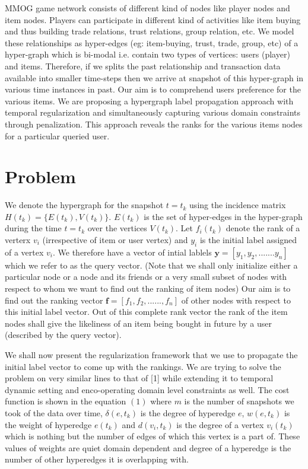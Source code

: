 \documentclass[conference]{IEEEtran}
\begin{document}
MMOG game network consists of different kind of nodes like player nodes and item nodes. Players can participate in different kind of activities like item buying and thus building trade relations, trust relations, group relation, etc. We model these relationships as hyper-edges (eg: item-buying, trust, trade, group, etc) of a hyper-graph which is bi-modal i.e. contain two types of vertices: users (player) and items. Therefore, if we splits the past relationship and transaction data available into smaller time-steps then we arrive at snapshot of this hyper-graph in various time instances in past. Our aim is to comprehend users preference for the various items. We are proposing a hypergraph label propagation approach with temporal regularization and simultaneously capturing various domain constraints through penalization. This approach reveals the ranks for the various items nodes for a particular queried user.

\section{Problem}

We denote the hypergraph for the snapshot $t=t_k$ using the incidence matrix $H(t_k)=\{E(t_k),V(t_k)\}$. ${E(t_k)}$ is the set of hyper-edges in the hyper-graph during the time $t=t_k$ over the vertices $V(t_k)$. Let \(f_i(t_k)\) denote the rank of a verterx \(v_i\) (irrespective of item or user vertex) and \(y_i\) is the initial label assigned of a vertex \(v_i\). We therefore have a vector of intial lablels \(\mathbf{y} = [y_1,y_2,.......y_n]\) which we refer to as the query vector. (Note that we shall only initialize either a particular node or a node and its friends or a very small subset of nodes with respect to whom we want to find out the ranking of item nodes) Our aim is to find out the ranking vector \(\mathbf{f} = [f_1,f_2,......,f_n]\) of other nodes with respect to this initial label vector. Out of this complete rank vector the rank of the item nodes shall give the likeliness of an item being bought in future by a user (described by the query vector).

We shall now present the regularization framework that we use to propagate the initial label vector to come up with the rankings. We are trying to solve the problem on very similar lines to that of [1] while extending it to temporal dynamic setting and enco-operating domain level constraints as well. The cost function is shown in the equation $(1)$ where \(m\) is the number of snapshots we took of the data over time, \(\delta(e,t_k)\) is the degree of hyperedge \(e\), \(w(e,t_k)\) is the weight of hyperedge \(e(t_k)\) and \(d(v_i,t_k)\) is the degree of a vertex \(v_i(t_k)\) which is nothing but the number of edges of which this vertex is a part of. These values of weights are quiet domain dependent and degree of a hyperedge is the number of other hyperedges it is overlapping with.
\end{document}
